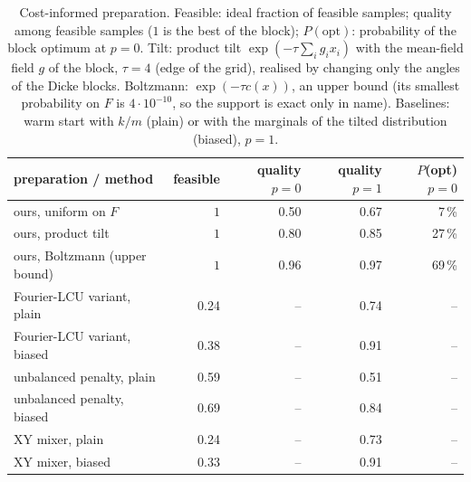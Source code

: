 \begin{table}[t]\centering\small
\caption{ Cost-informed preparation. Feasible: ideal fraction of feasible samples; quality among feasible samples ($1$ is the best of the block); $P(\mathrm{opt})$: probability of the block optimum at $p=0$. Tilt: product tilt $\exp(-\tau\sum_i g_ix_i)$ with the mean-field field $g$ of the block, $\tau=4$ (edge of the grid), realised by changing only the angles of the Dicke blocks. Boltzmann: $\exp(-\tau c(x))$, an upper bound (its smallest probability on $F$ is $4\cdot10^{-10}$, so the support is exact only in name). Baselines: warm start with $k/m$ (plain) or with the marginals of the tilted distribution (biased), $p=1$.}\label{tab:tilted_prep}
\begin{tabular}{lrrrr}\toprule
preparation / method & feasible & quality $p{=}0$ & quality $p{=}1$ & $P$(opt) $p{=}0$\\\midrule
ours, uniform on $F$ & $1$ & 0.50 & 0.67 & 7\,\%\\
ours, product tilt & $1$ & 0.80 & 0.85 & 27\,\%\\
ours, Boltzmann (upper bound) & $1$ & 0.96 & 0.97 & 69\,\%\\\midrule
Fourier-LCU variant, plain & 0.24 & -- & 0.74 & --\\
Fourier-LCU variant, biased & 0.38 & -- & 0.91 & --\\
unbalanced penalty, plain & 0.59 & -- & 0.51 & --\\
unbalanced penalty, biased & 0.69 & -- & 0.84 & --\\
XY mixer, plain & 0.24 & -- & 0.73 & --\\
XY mixer, biased & 0.33 & -- & 0.91 & --\\
\bottomrule\end{tabular}\end{table}
